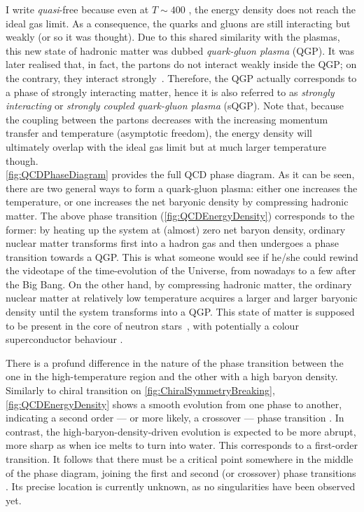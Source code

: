 I write \textit{quasi}-free because even at $T \sim 400 $ \mev, the energy density does not reach the ideal gas limit. As a consequence, the quarks and gluons are still interacting but weakly (or so it was thought). Due to this shared similarity with the plasmas, this new state of hadronic matter was dubbed \textit{quark-gluon plasma} (QGP). It was later realised that, in fact, the partons do not interact weakly inside the QGP; on the contrary, they interact strongly~\cite{borsanyiQCDEquationState2010}. Therefore, the QGP actually corresponds to a phase of strongly interacting matter, hence it is also referred to as \textit{strongly interacting} or \textit{strongly coupled quark-gluon plasma} (sQGP). Note that, because the coupling between the partons decreases with the increasing momentum transfer and temperature (asymptotic freedom), the energy density will ultimately overlap with the ideal gas limit but at much larger temperature though. \\


\Fig\ref{fig:QCDPhaseDiagram} provides the full QCD phase diagram. As it can be seen, there are two general ways to form a quark-gluon plasma: either one increases the temperature, or one increases the net baryonic density by compressing hadronic matter. The above phase transition (\fig\ref{fig:QCDEnergyDensity}) corresponds to the former: by heating up the system at (almost) zero net baryon density, ordinary nuclear matter transforms first into a hadron gas and then undergoes a phase transition towards a QGP. This is what someone would see if he/she could rewind the videotape of the time-evolution of the Universe, from nowadays to a few \musec after the Big Bang. On the other hand, by compressing hadronic matter, the ordinary nuclear matter at relatively low temperature acquires a larger and larger baryonic density until the system transforms into a QGP. This state of matter is supposed to be present in the core of neutron stars~\cite{annalaEvidenceQuarkmatterCores2020}, with potentially a colour superconductor behaviour \cite{alfordQCDFiniteBaryon1998}.


There is a profund difference in the nature of the phase transition between the one in the high-temperature region and the other with a high baryon density. Similarly to chiral transition on \fig\ref{fig:ChiralSymmetryBreaking}, \fig\ref{fig:QCDEnergyDensity} shows a smooth evolution from one phase to another, indicating a second order --- or more likely, a crossover --- phase transition \cite{philipsenQCDEquationState2013}. In contrast, the high-baryon-density-driven evolution is expected to be more abrupt, more sharp as when ice melts to turn into water. This corresponds to a first-order transition. It follows that there must be a critical point somewhere in the middle of the phase diagram, joining the first and second (or crossover) phase transitions \cite{stephanovQCDPhaseDiagram2005}. Its precise location is currently unknown, as no singularities have been observed yet.


